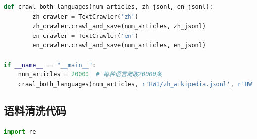 \documentclass[11pt]{article}
\begin{document}
\begin{lstlisting}[language=Python]
	def crawl_both_languages(num_articles, zh_jsonl, en_jsonl):
		zh_crawler = TextCrawler('zh')
		zh_crawler.crawl_and_save(num_articles, zh_jsonl)
		en_crawler = TextCrawler('en')
		en_crawler.crawl_and_save(num_articles, en_jsonl)

if __name__ == "__main__":
	num_articles = 20000  # 每种语言爬取20000条
	crawl_both_languages(num_articles, r'HW1/zh_wikipedia.jsonl', r'HW1/en_wikipedia.jsonl')
		\end{lstlisting}
	\subsection{语料清洗代码}
		\begin{lstlisting}[language=Python]
import re
		\end{lstlisting}
	
\end{document}
